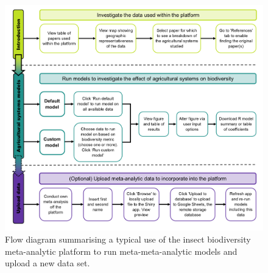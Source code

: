 \documentclass[11pt]{article}
\begin{document}
			\begin{figure}[H] 
				\centering 
				\includegraphics[scale=0.5]{figure_1_app_usage_flow_diagram.png} 
				\caption{Flow diagram summarising a typical use of the insect biodiversity meta-analytic platform to run meta-meta-analytic models and upload a new data set.}  
			\end{figure}
		
\end{document}
